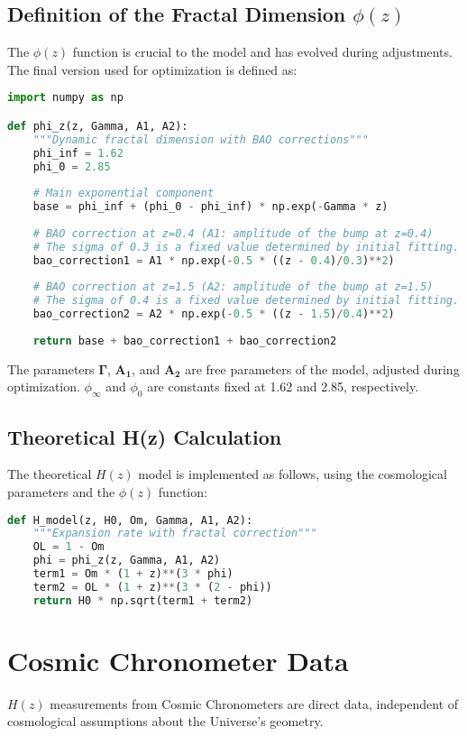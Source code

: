 \documentclass{article}
\begin{document}
\subsection{Definition of the Fractal Dimension $\phi(z)$}
The $\phi(z)$ function is crucial to the model and has evolved during adjustments. The final version used for optimization is defined as:
\begin{lstlisting}[language=Python, caption=Full definition of the $\phi(z)$ function]
import numpy as np

def phi_z(z, Gamma, A1, A2):
    """Dynamic fractal dimension with BAO corrections"""
    phi_inf = 1.62
    phi_0 = 2.85
    
    # Main exponential component
    base = phi_inf + (phi_0 - phi_inf) * np.exp(-Gamma * z)
    
    # BAO correction at z=0.4 (A1: amplitude of the bump at z=0.4)
    # The sigma of 0.3 is a fixed value determined by initial fitting.
    bao_correction1 = A1 * np.exp(-0.5 * ((z - 0.4)/0.3)**2)  
    
    # BAO correction at z=1.5 (A2: amplitude of the bump at z=1.5)
    # The sigma of 0.4 is a fixed value determined by initial fitting.
    bao_correction2 = A2 * np.exp(-0.5 * ((z - 1.5)/0.4)**2)  
    
    return base + bao_correction1 + bao_correction2
\end{lstlisting}
The parameters $\mathbf{\Gamma}$, $\mathbf{A_1}$, and $\mathbf{A_2}$ are free parameters of the model, adjusted during optimization. $\phi_{\infty}$ and $\phi_0$ are constants fixed at 1.62 and 2.85, respectively.

\subsection{Theoretical H(z) Calculation}
The theoretical $H(z)$ model is implemented as follows, using the cosmological parameters and the $\phi(z)$ function:
\begin{lstlisting}[language=Python, caption=Theoretical H(z) expansion rate model]
def H_model(z, H0, Om, Gamma, A1, A2):
    """Expansion rate with fractal correction"""
    OL = 1 - Om
    phi = phi_z(z, Gamma, A1, A2)
    term1 = Om * (1 + z)**(3 * phi)
    term2 = OL * (1 + z)**(3 * (2 - phi))
    return H0 * np.sqrt(term1 + term2)
\end{lstlisting}

\section{Cosmic Chronometer Data}
$H(z)$ measurements from Cosmic Chronometers are direct data, independent of cosmological assumptions about the Universe's geometry.
\end{document}
